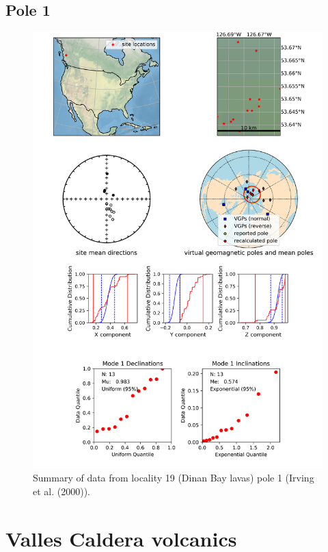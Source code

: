 \documentclass{article}
\begin{document}
\subsection{Pole 1}


\begin{figure}[H]
\centering
\includegraphics[width=5 in]{./19/1/pole_summary.png}
\caption{Summary of data from locality 19 (Dinan Bay lavas) pole 1 (Irving et al. (2000)).}
\end{figure}

\section{Valles Caldera volcanics}
\end{document}

